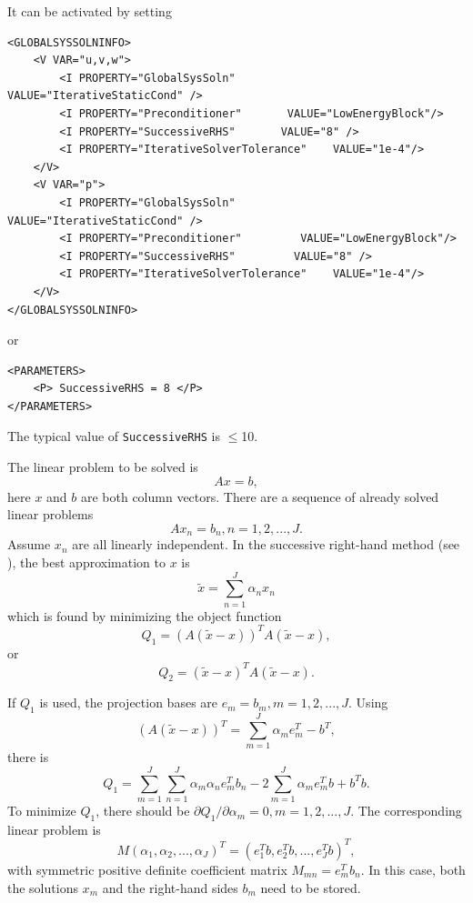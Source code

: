 It can be activated by setting
\begin{lstlisting}[style=XMLStyle]
<GLOBALSYSSOLNINFO>
    <V VAR="u,v,w">
        <I PROPERTY="GlobalSysSoln"         VALUE="IterativeStaticCond" />
        <I PROPERTY="Preconditioner"       VALUE="LowEnergyBlock"/>
        <I PROPERTY="SuccessiveRHS"       VALUE="8" />
        <I PROPERTY="IterativeSolverTolerance"    VALUE="1e-4"/>
    </V>
    <V VAR="p">
        <I PROPERTY="GlobalSysSoln"           VALUE="IterativeStaticCond" />
        <I PROPERTY="Preconditioner"         VALUE="LowEnergyBlock"/>
        <I PROPERTY="SuccessiveRHS"         VALUE="8" />
        <I PROPERTY="IterativeSolverTolerance"    VALUE="1e-4"/>
    </V>
</GLOBALSYSSOLNINFO>
\end{lstlisting}
or
\begin{lstlisting}[style=XMLStyle]
<PARAMETERS>
    <P> SuccessiveRHS = 8 </P>
</PARAMETERS>
\end{lstlisting}
The typical value of \texttt{SuccessiveRHS} is $\le$10.

The linear problem to be solved is
\begin{equation}\label{eq:linearEquationNew}
A x = b,
\end{equation}
here $x$ and $b$ are both column vectors.
There are a sequence of  already solved linear problems
\begin{equation}\label{eq:linearEquationOld}
A x_n = b_n, n = 1, 2, ..., J.
\end{equation}
Assume $x_n$ are all linearly independent.
In the successive right-hand method (see \cite{FISCHER1998193}), the best approximation to $x$ is
\begin{equation}\label{eq:approximate}
\tilde{x}=\sum_{n=1}^J\alpha_n x_n
\end{equation}
which is found by minimizing the object function
\begin{equation}\label{eq:objectFunction1}
Q_1 = \left(A(\tilde{x}-x)\right)^TA(\tilde{x}-x),
\end{equation}
or
\begin{equation}\label{eq:objectFunction2}
Q_2 = (\tilde{x}-x)^TA(\tilde{x}-x).
\end{equation}

If $Q_1$ is used, the projection bases are $e_m = b_m, m = 1, 2, ..., J$. Using
\begin{equation}\label{eq:Atildex}
\left(A(\tilde{x}-x) \right)^T= \sum_{m=1}^J\alpha_me_m^T - b^T,
\end{equation}
there is
\begin{equation}\label{eq:objectFunctionQ1_v2}
Q_1= \sum_{m=1}^J\sum_{n=1}^J\alpha_m\alpha_n e_m^T b_n - 2 \sum_{m=1}^J \alpha_m e_m^T b + b^T b.
\end{equation}
To minimize $Q_1$, there should be $\partial Q_1/\partial \alpha_m =0, m=1, 2, ..., J$.
The corresponding linear problem is
\begin{equation}\label{eq:objectFunctionQ1_solution}
M (\alpha_1, \alpha_2, ..., \alpha_J)^T =   (e_1^Tb, e_2^Tb, ..., e_J^Tb)^T,
\end{equation}
with symmetric positive definite coefficient matrix $M_{mn}=e_m^T b_n$. In this case, both the solutions $x_m$ and the right-hand sides $b_m$ need to be stored.

